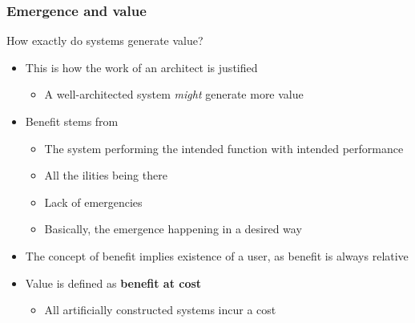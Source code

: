 \documentclass[10pt, compress]{beamer}
\begin{document}
\begin{frame}[fragile]
  \frametitle{Emergence and value}
  	How exactly do systems generate value?
		\begin{itemize}
			\item This is how the work of an architect is justified
			\begin{itemize}
				\item A well-architected system \emph{might} generate more value
			\end{itemize}
			\item Benefit stems from 
			\begin{itemize}
				\item The system performing the intended function with intended performance
				\item All the ilities being there 
				\item Lack of emergencies
				\item Basically, the emergence happening in a desired way
			\end{itemize}
			\item The concept of benefit implies existence of a user, as benefit is always relative
			\item Value is defined as  \textbf{benefit at cost}
			\begin{itemize}
				\item All artificially constructed systems incur a cost
			\end{itemize}
		\end{itemize}
\end{frame}
\end{document}
